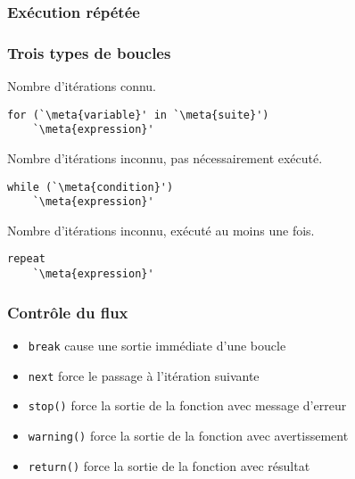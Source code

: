 \begin{frame}
  \frametitle{Exécution répétée}

\end{frame}

\begin{frame}[fragile=singleslide]
  \frametitle{Trois types de boucles}

  Nombre d'itérations connu.
  \begin{Schunk}
\begin{lstlisting}
for (`\meta{variable}' in `\meta{suite}')
    `\meta{expression}'
\end{lstlisting}
  \end{Schunk}

  Nombre d'itérations inconnu, pas nécessairement exécuté.
  \begin{Schunk}
\begin{lstlisting}
while (`\meta{condition}')
    `\meta{expression}'
\end{lstlisting}
  \end{Schunk}

  Nombre d'itérations inconnu, exécuté au moins une fois.
  \begin{Schunk}
\begin{lstlisting}
repeat
    `\meta{expression}'
\end{lstlisting}
  \end{Schunk}
\end{frame}

\begin{frame}
  \frametitle{Contrôle du flux}

  \begin{itemize}
  \item \texttt{break} cause une sortie immédiate d'une boucle
  \item \texttt{next} force le passage à l'itération suivante
  \item \texttt{stop()} force la sortie de la fonction avec message
    d'erreur
  \item \texttt{warning()} force la sortie de la fonction avec
    avertissement
  \item \texttt{return()} force la sortie de la fonction avec résultat
  \end{itemize}

  \pause
\end{frame}

